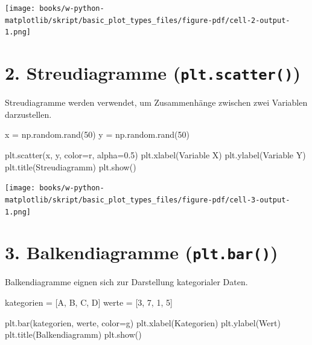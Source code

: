 \documentclass[
  letterpaper,
  DIV=11,
  numbers=noendperiod]{scrreprt}
\newenvironment{Shaded}{\begin{snugshade}}{\end{snugshade}}
\newcommand{\DecValTok}[1]{\textcolor[rgb]{0.68,0.00,0.00}{#1}}
\newcommand{\FloatTok}[1]{\textcolor[rgb]{0.68,0.00,0.00}{#1}}
\newcommand{\NormalTok}[1]{\textcolor[rgb]{0.00,0.23,0.31}{#1}}
\newcommand{\OperatorTok}[1]{\textcolor[rgb]{0.37,0.37,0.37}{#1}}
\newcommand{\StringTok}[1]{\textcolor[rgb]{0.13,0.47,0.30}{#1}}
\begin{document}
\texttt{[image: books/w-python-matplotlib/skript/basic\_plot\_types\_files/figure-pdf/cell-2-output-1.png]}

\section{\texorpdfstring{2. Streudiagramme
(\texttt{plt.scatter()})}{2. Streudiagramme (plt.scatter())}}\label{streudiagramme-plt.scatter}

Streudiagramme werden verwendet, um Zusammenhänge zwischen zwei
Variablen darzustellen.

\begin{Shaded}
\begin{Highlighting}[]
\NormalTok{x }\OperatorTok{=}\NormalTok{ np.random.rand(}\DecValTok{50}\NormalTok{)}
\NormalTok{y }\OperatorTok{=}\NormalTok{ np.random.rand(}\DecValTok{50}\NormalTok{)}

\NormalTok{plt.scatter(x, y, color}\OperatorTok{=}\StringTok{\textquotesingle{}r\textquotesingle{}}\NormalTok{, alpha}\OperatorTok{=}\FloatTok{0.5}\NormalTok{)}
\NormalTok{plt.xlabel(}\StringTok{\textquotesingle{}Variable X\textquotesingle{}}\NormalTok{)}
\NormalTok{plt.ylabel(}\StringTok{\textquotesingle{}Variable Y\textquotesingle{}}\NormalTok{)}
\NormalTok{plt.title(}\StringTok{\textquotesingle{}Streudiagramm\textquotesingle{}}\NormalTok{)}
\NormalTok{plt.show()}
\end{Highlighting}
\end{Shaded}

\texttt{[image: books/w-python-matplotlib/skript/basic\_plot\_types\_files/figure-pdf/cell-3-output-1.png]}

\section{\texorpdfstring{3. Balkendiagramme
(\texttt{plt.bar()})}{3. Balkendiagramme (plt.bar())}}\label{balkendiagramme-plt.bar}

Balkendiagramme eignen sich zur Darstellung kategorialer Daten.

\begin{Shaded}
\begin{Highlighting}[]
\NormalTok{kategorien }\OperatorTok{=}\NormalTok{ [}\StringTok{\textquotesingle{}A\textquotesingle{}}\NormalTok{, }\StringTok{\textquotesingle{}B\textquotesingle{}}\NormalTok{, }\StringTok{\textquotesingle{}C\textquotesingle{}}\NormalTok{, }\StringTok{\textquotesingle{}D\textquotesingle{}}\NormalTok{]}
\NormalTok{werte }\OperatorTok{=}\NormalTok{ [}\DecValTok{3}\NormalTok{, }\DecValTok{7}\NormalTok{, }\DecValTok{1}\NormalTok{, }\DecValTok{5}\NormalTok{]}

\NormalTok{plt.bar(kategorien, werte, color}\OperatorTok{=}\StringTok{\textquotesingle{}g\textquotesingle{}}\NormalTok{)}
\NormalTok{plt.xlabel(}\StringTok{\textquotesingle{}Kategorien\textquotesingle{}}\NormalTok{)}
\NormalTok{plt.ylabel(}\StringTok{\textquotesingle{}Wert\textquotesingle{}}\NormalTok{)}
\NormalTok{plt.title(}\StringTok{\textquotesingle{}Balkendiagramm\textquotesingle{}}\NormalTok{)}
\NormalTok{plt.show()}
\end{Highlighting}
\end{Shaded}
\end{document}
